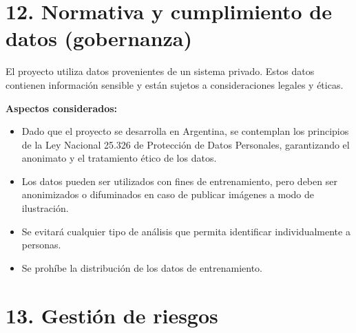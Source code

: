 \documentclass[
11pt, %
]{charter}
\begin{document}
\section{12. Normativa y cumplimiento de datos (gobernanza)}

El proyecto utiliza datos provenientes de un sistema privado. Estos datos contienen información sensible y están sujetos a consideraciones legales y éticas.

\textbf{Aspectos considerados:}
\begin{itemize}
  \item Dado que el proyecto se desarrolla en Argentina, se contemplan los principios de la
Ley Nacional 25.326 de Protección de Datos Personales, garantizando el anonimato y
el tratamiento ético de los datos.
  \item Los datos pueden ser utilizados con fines de entrenamiento, pero deben ser anonimizados o difuminados en caso de publicar imágenes a modo de ilustración.
  \item Se evitará cualquier tipo de análisis que permita identificar individualmente a personas.
  \item Se prohíbe la distribución de los datos de entrenamiento.
\end{itemize}

\section{13. Gestión de riesgos}
\label{sec:riesgos}
\end{document}
